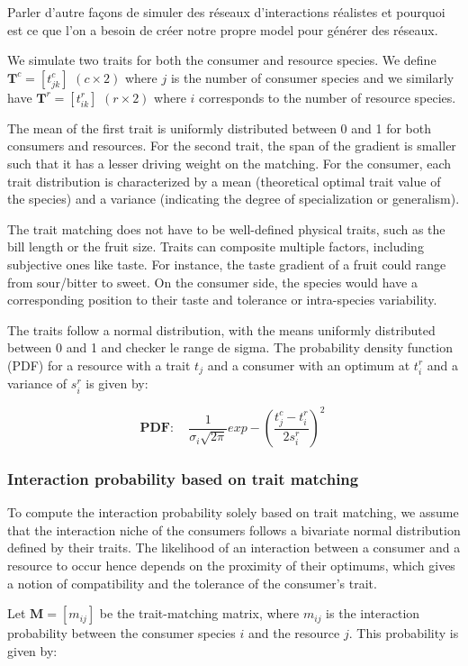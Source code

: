 Parler d'autre façons de simuler des réseaux d'interactions réalistes et pourquoi est ce que l'on a besoin de créer notre propre model pour générer des réseaux.

We simulate two traits for both the consumer and resource species. We define $\mathbf{T}^c = [t^c_{jk}]$ $(c \times 2)$ where $j$ is the number of consumer species and we similarly have $\mathbf{T}^r = [t^r_{ik}]$ $(r \times 2)$ where $i$ corresponds to the number of resource species.

The mean of the first trait is uniformly distributed between 0 and 1 for both consumers and resources. For the second trait, the span of the gradient is smaller such that it has a lesser  driving weight on the matching.
For the consumer, each trait distribution is characterized by a mean (theoretical optimal trait value of the species) and a variance (indicating the degree of specialization or generalism).

The trait matching does not have to be well-defined physical traits, such as the bill length or the fruit size. Traits can composite multiple factors, including subjective ones like taste. For instance, the taste gradient of a fruit could range from sour/bitter to sweet. On the consumer side, the species would have a corresponding position to their taste and tolerance or intra-species variability.

The traits follow a normal distribution, with the means uniformly distributed between 0 and 1 and checker le range de sigma. The probability density function (PDF) for a resource with a trait $t_j$ and a consumer with an optimum at $t_i^r$ and a variance of $s_i^r$ is given by:

$$
    \mathbf{PDF:} \quad \frac{1}{\sigma_i\sqrt{2\pi}} exp -\left(\frac{t_j^c-t_i^r}{2s_i^r}\right)^{\!2}\
$$

\subsubsection{Interaction probability based on trait matching}

To compute the interaction probability solely based on trait matching, we assume that the interaction niche of the consumers follows a bivariate normal distribution defined by their traits. The likelihood of an interaction between a consumer and a resource to occur hence depends on the proximity of their optimums, which gives a notion of compatibility and the tolerance of the consumer's trait.

Let $\mathbf{M} = [m_{ij}]$ be the trait-matching matrix, where $m_{ij}$ is the interaction probability between the consumer species $i$ and the resource $j$. This probability is given by:

